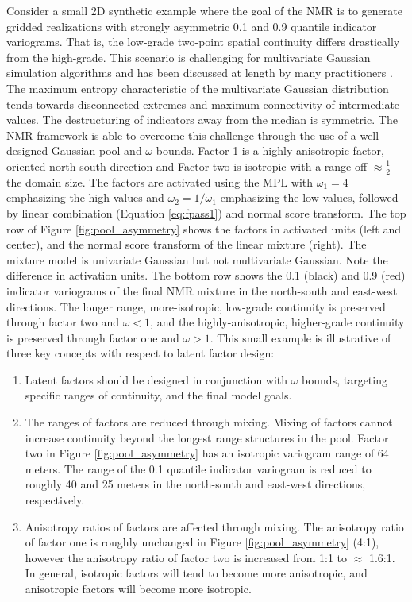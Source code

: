 Consider a small \gls{2D} synthetic example where the goal of the \gls{NMR} is to generate gridded realizations with strongly asymmetric 0.1 and 0.9 quantile indicator variograms. That is, the low-grade two-point spatial continuity differs drastically from the high-grade. This scenario is challenging for multivariate Gaussian simulation algorithms and has been discussed at length by many practitioners \citep{journel1983nonparametric, gomez-hernandez1998be, journel1993entropy,renard2011conditioning, guthke2013non}. The maximum entropy characteristic of the multivariate Gaussian distribution tends towards disconnected extremes and maximum connectivity of intermediate values. The destructuring of indicators away from the median is symmetric. The \gls{NMR} framework is able to overcome this challenge through the use of a well-designed Gaussian pool and $\omega$ bounds. Factor 1 is a highly anisotropic factor, oriented north-south direction and Factor two is isotropic with a range off $\approx \frac{1}{2}$ the domain size. The factors are activated using the \gls{MPL} with $\omega_{1}=4$ emphasizing the high values and $\omega_{2}=1/\omega_{1}$ emphasizing the low values, followed by linear combination (Equation \ref{eq:fpass1}) and normal score transform. The top row of Figure \ref{fig:pool_asymmetry} shows the factors in activated units (left and center), and the normal score transform of the linear mixture (right). The mixture model is univariate Gaussian but not multivariate Gaussian. Note the difference in activation units. The bottom row shows the 0.1 (black) and 0.9 (red) indicator variograms of the final \gls{NMR} mixture in the north-south and east-west directions. The longer range, more-isotropic, low-grade continuity is preserved through factor two and $\omega < 1$, and the highly-anisotropic, higher-grade continuity is preserved through factor one and $\omega > 1$. This small example is illustrative of three key concepts with respect to latent factor design:
\begin{enumerate}[noitemsep]
    \item Latent factors should be designed in conjunction with $\omega$ bounds, targeting specific ranges of continuity, and the final model goals.
    \item The ranges of factors are reduced through mixing. Mixing of factors cannot increase continuity beyond the longest range structures in the pool. Factor two in Figure \ref{fig:pool_asymmetry} has an isotropic variogram range of 64 meters. The range of the 0.1 quantile indicator variogram is reduced to roughly 40 and 25 meters in the north-south and east-west directions, respectively.
    \item Anisotropy ratios of factors are affected through mixing. The anisotropy ratio of factor one is roughly unchanged in Figure \ref{fig:pool_asymmetry} (4:1), however the anisotropy ratio of factor two is increased from 1:1 to $\approx$ 1.6:1. In general, isotropic factors will tend to become more anisotropic, and anisotropic factors will become more isotropic.
\end{enumerate}

